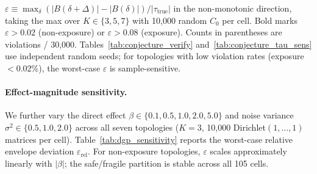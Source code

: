 $\varepsilon \equiv \max_\delta(|B(\delta{+}\Delta)|{-}|B(\delta)|)/|\tau_{\text{true}}|$ in the non-monotonic direction, taking the max over $K \in \{3,5,7\}$ with 10{,}000 random $C_0$ per cell. Bold marks $\varepsilon > 0.02$ (non-exposure) or $\varepsilon > 0.08$ (exposure). Counts in parentheses are violations / 30{,}000. Tables~\ref{tab:conjecture_verify} and~\ref{tab:conjecture_tau_sens} use independent random seeds; for topologies with low violation rates (exposure $<$0.02\%), the worst-case $\varepsilon$ is sample-sensitive.

\begin{table}[H]
\centering
\caption{DGP parameter sensitivity of envelope monotonicity violations.}
\label{tab:conjecture_tau_sens}
\end{table}

\paragraph{Effect-magnitude sensitivity.}
We further vary the direct effect $\beta \in \{0.1, 0.5, 1.0, 2.0, 5.0\}$ and noise variance $\sigma^2 \in \{0.5, 1.0, 2.0\}$ across all seven topologies ($K{=}3$, 10{,}000 Dirichlet$(1,\ldots,1)$ matrices per cell). Table~\ref{tab:dgp_sensitivity} reports the worst-case relative envelope deviation $\varepsilon_{\text{rel}}$. For non-exposure topologies, $\varepsilon$ scales approximately linearly with $|\beta|$; the safe/fragile partition is stable across all 105 cells.

